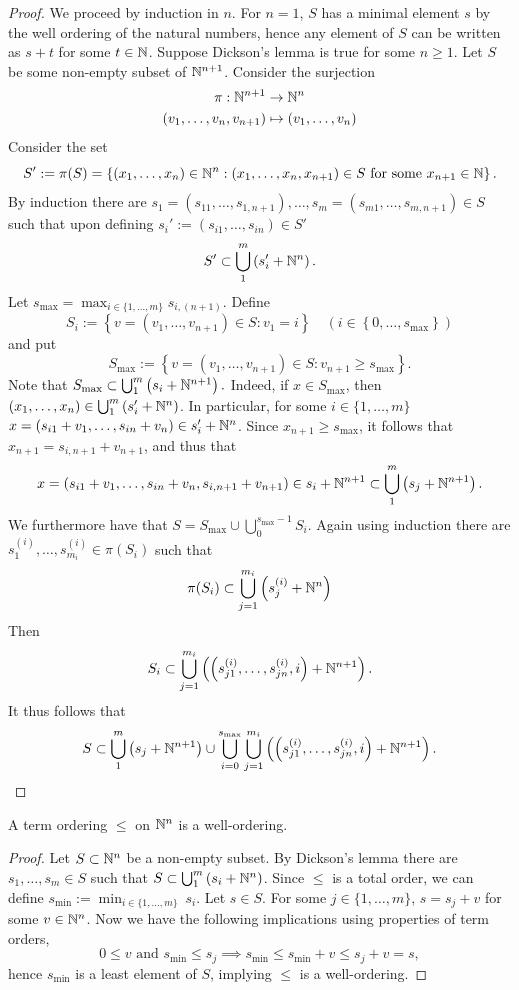 \begin{proof}
    We proceed by induction in $n$. For $n=1$, $S$ has a minimal element $s$ by the well ordering of the natural numbers, hence any element of $S$ can be written as $s+t$ for some $t\in \mathbb{N}$. Suppose Dickson's lemma is true for some $n\geq 1$. Let $S$ be some non-empty subset of $\mathbb{N}^{n+1}$. Consider the surjection 
    \begin{gather*}
        \pi : \mathbb{N}^{n+1}\rightarrow \mathbb{N}^n\\
        (v_1,\dots,v_n,v_{n+1})\mapsto (v_1,\dots,v_n)
    \end{gather*}
    Consider the set 
    $$S' := \pi(S) = \left\{(x_1,\dots,x_n)\in \mathbb{N}^n : (x_1,\dots,x_n,x_{n+1})\in S \text{ for some }x_{n+1}\in \mathbb{N} \right\}.$$
    By induction there are $s_1=(s_{11},\dots,s_{1,n+1}),\dots,s_m=
    (s_{m1},\dots,s_{m,n+1})\in S$ such that upon defining $s_i' := 
    (s_{i1},\dots,s_{in})\in S'$ 
    $$S' \subset \bigcup_1^m \left(s_i'+\mathbb{N}^n\right).$$
    Let $s_\text{max} = \max_{i\in \{1,\dots,m\}} s_{i,(n+1)}$.
    Define 
    $$S_i :=\left\{v=(v_1,\dots,v_{n+1})\in S : v_1 = i\right\} \quad \left(i\in\left\{0,\dots, s_\text{max}\right\}\right)$$
    and put 
    $$S_\text{max} := \left\{ v=(v_1,\dots,v_{n+1}) \in S : v_{n+1} \geq s_\text{max}\right\}.$$
    Note that $S_{\max} \subset \bigcup_1^m\left(s_i+\mathbb{N}^{n+1}\right).$ Indeed, if $x\in S_{\max}$, then $(x_1,\dots,x_n)\in \bigcup_1^m \left(s_i'+\mathbb{N}^n\right)$. In particular, for some $i\in\{1,\dots,m\}$  $x = (s_{i1}+v_1,\dots,s_{in}+v_n)\in s_i'+\mathbb{N}^n$. Since $x_{n+1}\geq s_{\max}$, it follows that $x_{n+1} = s_{i,n+1}+v_{n+1}$, and thus that 
    $$x = \left(s_{i1}+v_1,\dots,s_{in}+v_n,s_{i,n+1}+v_{n+1}\right)\in s_i+\mathbb{N}^{n+1}\subset \bigcup_1^m \left( s_j+\mathbb{N}^{n+1}\right).$$
    We furthermore have that $S = S_\text{max} \cup \bigcup_0^{s_\text{max}-1} S_i$. Again using induction there are $s_1^{(i)},\dots,s_{m_i}^{(i)}\in \pi(S_i)$ such that 
    $$\pi(S_i)\subset  \bigcup_{j=1}^{m_i} \left(s_j^{(i)} + \mathbb{N}^n\right)$$
    Then 
    $$S_i \subset \bigcup_{j=1}^{m_i} \left( \left(s_{j1}^{(i)},\dots,s_{jn}^{(i)},i\right) + \mathbb{N}^{n+1}\right).$$
    It thus follows that 
    $$S \subset \bigcup_1^m \left(s_j + \mathbb{N}^{n+1}\right) \cup \bigcup_{i=0}^{s_{\max}} \bigcup_{j=1}^{m_i}\left( \left(s_{j1}^{(i)},\dots,s_{jn}^{(i)},i\right) + \mathbb{N}^{n+1}\right).$$
\end{proof}
\begin{corollary}
    A term ordering $\leq$ on $\mathbb{N}^n$ is a well-ordering. 
\end{corollary}
\begin{proof}
    Let $S\subset \mathbb{N}^n$ be a non-empty subset. By Dickson's lemma there are $s_1,\dots,s_m\in S$ such that $S\subset \bigcup_1^m \left(s_i+\mathbb{N}^n\right)$. Since $\leq$ is a total order, we can define $s_{\min} := \min_{i\in\{1,\dots,m\}}\ s_i$. Let $s\in S$. For some $j\in \{1,\dots,m\}$, $s= s_j + v$ for some $v\in \mathbb{N}^n$. Now we have the following implications using properties of term orders,
    $$0\leq v \text{ and } s_{\min}\leq s_j \implies s_{\min} \leq s_{\min}+v \leq s_j + v = s,$$
    hence $s_{\min}$ is a least element of $S$, implying $\leq$ is a well-ordering. 
\end{proof}
